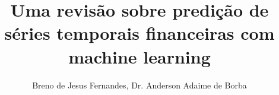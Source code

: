 
\sloppy

\title{Uma revisão sobre predição de séries temporais financeiras com machine learning}

\author{Breno de Jesus Fernandes, Dr. Anderson Adaime de Borba}

\address{
	Ciência da Computação\\
	Faculdade de Computação e Informática\\
	Universidade Presbiteriana Mackenzie\\
	São Paulo -- SP -- Brasil
}
